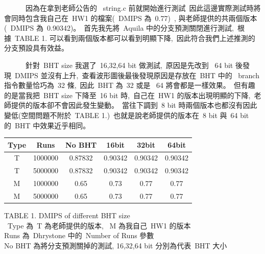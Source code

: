 \documentclass{article}
\begin{document}
\begin{CJK*}{UTF8}{bsmi}
\begin{multicols}{2}
\begin{flushleft}
\end{flushleft}

\begin{flushleft}
    \ \ \ \ \ \ 因為在拿到老師公告的 \ string.c 前就開始進行測試\
    因此這邊實際測試時將會同時包含我自己在\ HW1 的檔案(\ DMIPS 為\ 0.77)\
    , 與老師提供的共兩個版本(\ DMIPS 為\ 0.90342)。\
    首先我先將\ Aquila 中的分支預測關閉進行測試,\
    根據\ TABLE 1. 可以看到兩個版本都可以看到明顯下降,\
    因此符合我們上述推測的分支預設具有效益。
\end{flushleft}

\begin{flushleft}
    \ \ \ \ \ \ 針對\ BHT size 我選了\ 16,32,64 bit 做測試,\
    原因是先改到 \ 64 bit 後發現\ DMIPS 並沒有上升,\
    查看波形圖後最後發現原因是存放在\ BHT 中的 \ branch 指令數量恰巧為\ 32 條,\
    因此\ BHT 為\ 32 或是 \ 64 將會都是一樣效果。\
    但有趣的是當我把\ BHT size 下降至\ 16 bit 時,\
    自己在\ HW1 的版本出現明顯的下降,\
    老師提供的版本卻不會因此發生變動。\
    當往下調到\ 8 bit 時兩個版本也都沒有因此變低(空間問題不附於\ TABLE 1.)\
    也就是說老師提供的版本在\ 8 bit 與\ 64 bit 的\ BHT 中效果近乎相同。
\end{flushleft}


\begin{center}
    \begin{tabular}{||c c c c c c||} 
     \hline
     Type & Runs & No BHT & 16bit & 32bit & 64bit \\ [2ex] 
     \hline\hline
     T &  1000000 & 0.87832 & 0.90342 & 0.90342 & 0.90342 \\ 
     \hline
     T &  5000000 & 0.87832 & 0.90342 & 0.90342 & 0.90342 \\ 
     \hline
     M & 1000000 & 0.65 & 0.73 & 0.77 & 0.77 \\
     \hline
     M & 5000000 & 0.65 & 0.73 & 0.77 & 0.77 \\
     \hline
    \end{tabular}
\end{center}

\begin{center}
    \small{TABLE 1. DMIPS of different BHT size}\\
    \footnotesize{\ Type 為\ T 為老師提供的版本, \ M 為我自己\ HW1 的版本}\\
    Runs 為\ Dhrystone 中的\ Number of Runs 參數\\
    No BHT 為將分支預測關掉的測試, 16,32,64 bit 分別為代表\ BHT 大小
\end{center}


\end{multicols}
\end{CJK*}
\end{document}
